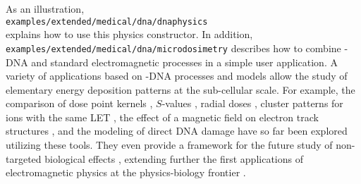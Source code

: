 As an illustration, \\
\verb"examples/extended/medical/dna/dnaphysics"\\
explains how to use this physics constructor.  In addition,
\verb"examples/extended/medical/dna/microdosimetry" describes how to 
combine \Gfour{}-DNA and \Gfour{} standard electromagnetic processes in a simple
user application.  A variety of applications based on \Gfour{}-DNA processes and
models allow the study of elementary energy deposition patterns at the 
sub-cellular scale.  For example, the comparison of dose point kernels 
\cite{embib:dnaPK}, $S$-values  \cite{embib:dnaS}, radial doses 
\cite{embib:dnaRad}, cluster patterns for ions with the same LET 
\cite{embib:dnaLET}, the effect of a magnetic field on electron track structures
\cite{embib:dnaMag}, and the modeling of direct DNA damage 
\cite{embib:dnaDirD1,embib:dnaDirD2,embib:dnaDirD3,embib:dnaDirD4}
have so far been explored utilizing these tools.  They even provide a framework
for the future study of non-targeted biological effects \cite{embib:dnaBio}, 
extending further the first applications of \Gfour{} electromagnetic physics at 
the physics-biology frontier
\cite{embib:dnaBio1,embib:dnaBio2,embib:dnaBio3,embib:dnaBio4,embib:dnaBio6,embib:dnaBio7,embib:dnaBio8}.


